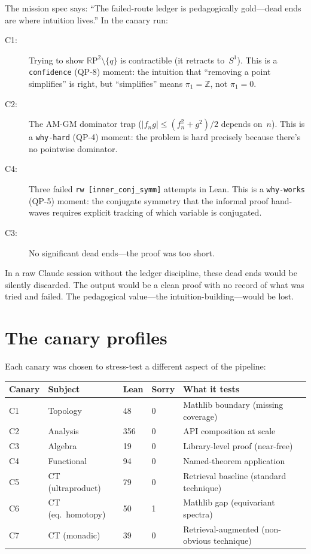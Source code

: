 \documentclass[12pt,oneside]{book}
\theoremstyle{plain}
\theoremstyle{definition}
\theoremstyle{remark}
\newcommand{\RP}{\mathbb{R}\mathrm{P}}
\begin{document}
The mission spec says: ``The failed-route ledger is pedagogically
gold---dead ends are where intuition lives.'' In the canary run:

\begin{description}
\item[C1:] Trying to show $\RP^2 \setminus \{q\}$ is contractible
  (it retracts to~$S^1$). This is a \texttt{confidence} (QP-8)
  moment: the intuition that ``removing a point simplifies'' is right,
  but ``simplifies'' means $\pi_1 = \mathbb{Z}$, not $\pi_1 = 0$.
\item[C2:] The AM-GM dominator trap ($|f_n g| \le (f_n^2 + g^2)/2$
  depends on~$n$). This is a \texttt{why-hard} (QP-4) moment: the
  problem is hard precisely because there's no pointwise dominator.
\item[C4:] Three failed \texttt{rw [inner\_conj\_symm]} attempts in
  Lean. This is a \texttt{why-works} (QP-5) moment: the conjugate
  symmetry that the informal proof hand-waves requires explicit tracking
  of which variable is conjugated.
\item[C3:] No significant dead ends---the proof was too short.
\end{description}

In a raw Claude session without the ledger discipline, these dead ends
would be silently discarded. The output would be a clean proof with no
record of what was tried and failed. The pedagogical value---the
intuition-building---would be lost.

\section{The canary profiles}

Each canary was chosen to stress-test a different aspect of the pipeline:

\begin{center}
\begin{tabular}{llllp{4.5cm}}
\toprule
\textbf{Canary} & \textbf{Subject} & \textbf{Lean} & \textbf{Sorry} & \textbf{What it tests} \\
\midrule
C1 & Topology       & 48  & 0 & Mathlib boundary (missing coverage) \\
C2 & Analysis       & 356 & 0 & API composition at scale \\
C3 & Algebra        & 19  & 0 & Library-level proof (near-free) \\
C4 & Functional     & 94  & 0 & Named-theorem application \\
C5 & CT (ultraproduct) & 79 & 0 & Retrieval baseline (standard technique) \\
C6 & CT (eq.\ homotopy) & 50 & 1 & Mathlib gap (equivariant spectra) \\
C7 & CT (monadic)   & 39  & 0 & Retrieval-augmented (non-obvious technique) \\
\bottomrule
\end{tabular}
\end{center}
\end{document}
